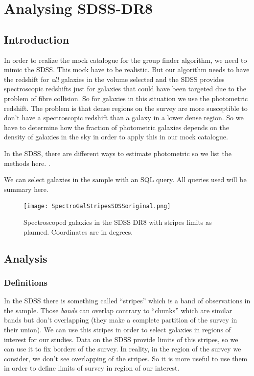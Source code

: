 \chapter{Analysing SDSS-DR8\label{ap:sdss}}
%
\section{Introduction}
%
In order to realize the mock catalogue for the group finder algorithm, we need
to mimic the SDSS\@. This mock have to be realistic. But our algorithm needs to
have the redshift for \emph{all} galaxies in the volume selected and the SDSS
provides spectroscopic redshifts just for galaxies that could have been
targeted due to the problem of fibre collision. So for galaxies in this
situation we use the photometric redshift. The problem is that dense regions on
the survey are more susceptible to don't have a spectroscopic redshift than a
galaxy in a lower dense region. So we have to determine how the fraction of
photometric galaxies depends on the density of galaxies in the sky in order to
apply this in our mock catalogue.

In the SDSS, there are different ways to estimate photometric so we list the
methods here. .

We can select galaxies in the sample with an SQL query. All queries used will
be summary here.
%
\begin{figure}
    \centering
    \texttt{[image: SpectroGalStripesSDSSoriginal.png]}
    \caption{Spectroscoped galaxies in the SDSS DR8 with stripes limits as
    planned. Coordinates are in degrees.}
\label{fig:SDSSspecgalstripes}
\end{figure}
%
\section{Analysis}
%
\subsection{Definitions}
%
In the SDSS there is something called ``stripes'' which is a band of
observations in the sample. Those \emph{bands} can overlap contrary to
``chunks'' which are similar bands but don't overlapping (they make a complete
partition of the survey in their union). We can use this stripes in order to
select galaxies in regions of interest for our studies. Data on the SDSS
provide limits of this stripes, so we can use it to fix borders of the survey.
In reality, in the region of the survey we consider, we don't see overlapping
of the stripes. So it is more useful to use them in order to define limits of
survey in region of our interest.

